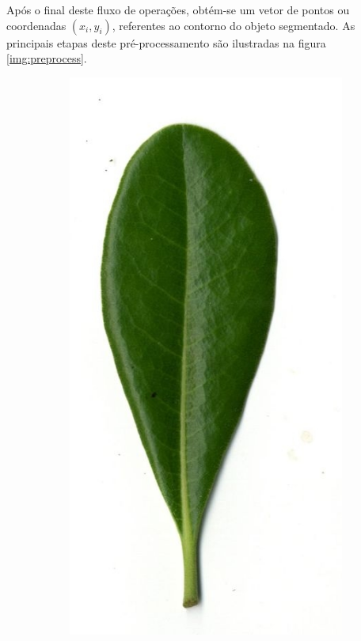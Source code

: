Após o final deste fluxo de operações, obtém-se um vetor de pontos ou coordenadas $(x_i, y_i)$, referentes ao contorno do objeto segmentado. As principais etapas deste pré-processamento são ilustradas na figura \ref{img:preprocess}.

\begin{figure}[htb]
	\centering
	\caption{Resultados da etapa de pré-processamento.}
	\begin{subfigure}[t]{0.24\textwidth}
		\centering
		\includegraphics[width=1\textwidth]{img/original.jpg}

\end{subfigure}
\end{figure}
